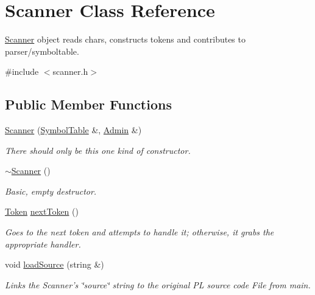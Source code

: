 \hypertarget{classScanner}{
\section{Scanner Class Reference}
\label{classScanner}
}


\hyperlink{classScanner}{Scanner} object reads chars, constructs tokens and contributes to parser/symboltable.  




{\ttfamily \#include $<$scanner.h$>$}

\subsection*{Public Member Functions}
\begin{DoxyCompactItemize}
\item 
\hyperlink{classScanner_afeff639ac96107cdd8f439a09ebceb1f}{Scanner} (\hyperlink{classSymbolTable}{SymbolTable} \&, \hyperlink{classAdmin}{Admin} \&)
\begin{DoxyCompactList}\small\item\em There should only be this one kind of constructor. \item\end{DoxyCompactList}\item 
\hyperlink{classScanner_a39f85e20f3ca942fd0a8e4bce88c27c7}{$\sim$Scanner} ()
\begin{DoxyCompactList}\small\item\em Basic, empty destructor. \item\end{DoxyCompactList}\item 
\hyperlink{classToken}{Token} \hyperlink{classScanner_ab43ce10667c1f695a396844449d3ab7d}{nextToken} ()
\begin{DoxyCompactList}\small\item\em Goes to the next token and attempts to handle it; otherwise, it grabs the appropriate handler. \item\end{DoxyCompactList}\item 
void \hyperlink{classScanner_a7fb5a6640567b85bd3b9dab76751dbb0}{loadSource} (string \&)
\begin{DoxyCompactList}\small\item\em Links the Scanner's \char`\"{}source\char`\"{} string to the original PL source code File from main. \item\end{DoxyCompactList}\item 

\end{DoxyCompactItemize}
